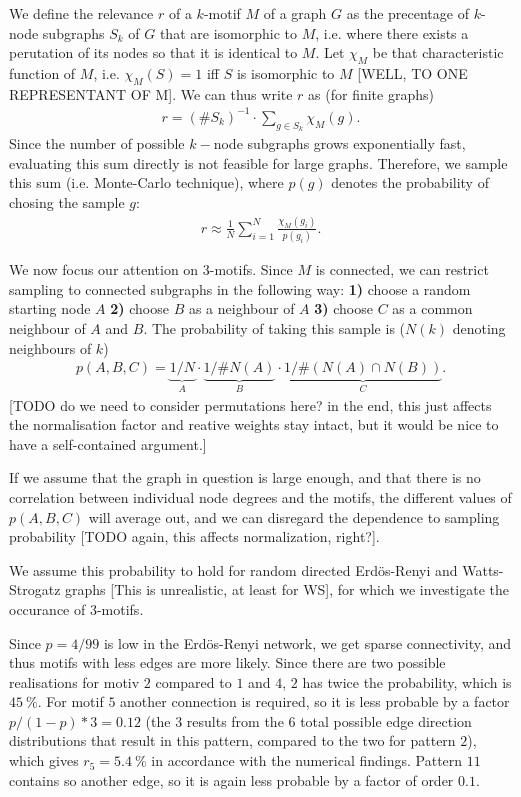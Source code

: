 \documentclass{scrartcl}
\begin{document}
We define the relevance $r$ of a $k$-motif $M$ of a graph $G$ as the
precentage of $k$-node subgraphs $S_k$ of $G$ that are isomorphic to $M$,
i.e. where there exists a perutation of its nodes so that it is identical
to $M$. Let $\chi_M$ be that characteristic function of $M$, i.e.
$\chi_M(S) = 1$ iff $S$ is isomorphic to $M$ [WELL, TO ONE REPRESENTANT OF
M]. We can thus write $r$ as (for finite graphs)
\begin{align}
 r = (\# S_k)^{-1} \cdot \sum_{g \in S_k} \chi_M (g).
\end{align}
Since the number of possible $k-$node subgraphs grows exponentially fast,
evaluating this sum directly is not feasible for large graphs. Therefore,
we sample this sum (i.e. Monte-Carlo technique), where $p(g)$ denotes the
probability of chosing the sample $g$:
\begin{align}
 r \approx \frac{1}{N} \sum_{i=1}^{N} \frac{\chi_M (g_i)}{p(g_i)}.
\end{align}

We now focus our attention on $3$-motifs. Since $M$ is connected, we can
restrict sampling to connected subgraphs in the following way: \textbf{1)}
choose a random starting node $A$ \textbf{2)} choose $B$ as a neighbour of
$A$ \textbf{3)} choose $C$ as a common neighbour of $A$ and $B$. The
probability of taking this sample is ($N(k)$ denoting neighbours of $k$)
\begin{align}
 p(A,B,C) = \underbrace{1/N}_{A} \cdot \underbrace{1/\#N(A)}_{B} \cdot \underbrace{1/\#(N(A) \cap N(B))}_{C}.
\end{align}
[TODO do we need to consider permutations here? in the end, this just
affects the normalisation factor and reative weights stay intact, but it
would be nice to have a self-contained argument.]

If we assume that the graph in question is large enough, and that there is
no correlation between individual node degrees and the motifs, the
different values of $p(A,B,C)$ will average out, and we can disregard the
dependence to sampling probability [TODO again, this affects normalization,
right?]. 

We assume this probability to hold for random directed Erdös-Renyi and
Watts-Strogatz graphs [This is unrealistic, at least for WS], for which we
investigate the occurance of 3-motifs.

Since $p=4/99$ is low in the Erdös-Renyi network, we get sparse
connectivity, and thus motifs with less edges are more likely. Since there
are two possible realisations for motiv $2$ compared to $1$ and $4$, $2$
has twice the probability, which is $\SI{45}{\percent}$. For motif $5$
another connection is required, so it is less probable by a factor
$p/(1-p)*3 = 0.12$ (the $3$ results from the $6$ total possible edge
direction distributions that result in this pattern, compared to the two
for pattern $2$), which gives $r_5=\SI{5.4}{\percent}$ in accordance with
the numerical findings. Pattern $11$ contains so another edge, so it is
again less probable by a factor of order $0.1$.
\end{document}
